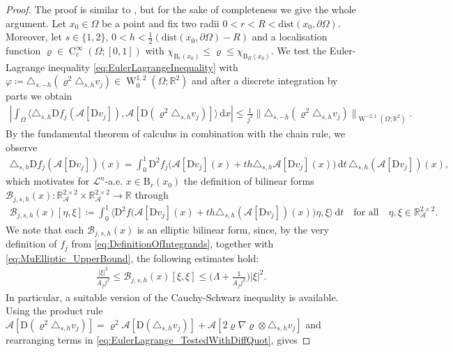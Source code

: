 \documentclass[a4paper,10pt,reqno,oneside]{amsart}
\numberwithin{equation}{section}
\newcommand{\R}{\mathbb R}
\newcommand{\ball}{\mathrm{B}}
\newcommand{\A}{\mathscr{A}}
\newcommand{\Leb}{\mathscr{L}}
\newcommand{\sobo}{\operatorname{W}}
\newcommand{\hold}{\operatorname{C}}
\newcommand{\D}{\mathrm{D}}
\newcommand{\dx}[1]{\,\mathrm{d}#1}
\newcommand{\del}{\partial}
\newcommand{\skalarProd}[2]{\big\langle#1,#2\big\rangle}
\newcommand{\abs}[1]{\left\lvert#1\right\rvert}
\begin{document}
\begin{proof}
	The proof is similar to \cite[Lemma 4.2]{Gmeineder}, but for the sake of completeness we give the whole argument. Let $x_0\in\Omega$ be a point and fix two radii $0<r<R<\mathrm{dist}(x_0,\del\Omega)$. Moreover, let $s\in\{1,2\}$,  $0<h<\frac{1}{2}(\mathrm{dist}(x_0,\del\Omega)-R)$ and a localisation function $\varrho\in\hold^\infty_c(\Omega;[0,1])$ with $\chi_{\ball_{r}(x_0)}\leq\varrho\leq \chi_{\ball_{R}(x_0)}$. We test the Euler-Lagrange inequality \eqref{eq:EulerLagrangeInequality} with $\varphi\coloneqq \triangle_{s,-h}(\varrho^2 \triangle_{s,h} v_j)\in\sobo^{1,2}_0(\Omega;\R^2)$ and after a discrete integration by parts we obtain
	\begin{align}\label{eq:EulerLagrange_TestedWithDiffQuot}
		\left\vert \int_\Omega \skalarProd{\triangle_{s,h}\D f_j(\A[\D v_j])}{\A[\D(\varrho^2 \triangle_{s,h}v_j)]}\dx{x} \right\vert \leq\frac{1}{j^2} \|\triangle_{s,-h}(\varrho^2 \triangle_{s,h}v_j)\|_{\sobo^{-2,1}(\Omega;\R^2)}. 
	\end{align}
	By the fundamental theorem of calculus in combination with the chain rule, we observe
	\begin{align*}
		\triangle_{s,h} \D f_j(\A[\D v_j])(x) 
		 = \int_0^1 \D^2 f_j\big(\A[\D v_j](x) + th \triangle_{s,h} \A[\D v_j](x)\big)\dx{t} \,\triangle_{s,h} (\A[\D v_j])(x),
	\end{align*}
	which motivates for $\Leb^n$-a.e. $x\in \ball_{r}(x_0)$ the definition of bilinear forms 
	$\mathscr{B}_{j,s,h}(x):\R^{2\times 2}_\A \times \R^{2\times 2}_\A\to \R$
	through
	 \begin{align*}
	 	\mathscr{B}_{j,s,h}(x)[\eta,\xi]\coloneqq \int_0^1 \skalarProd{\D^2 f\big(\A[\D v_j] (x) + th \triangle_{s,h}(\A[\D v_j])(x)\big)\eta }{\xi}\dx{t}\quad\mbox{for all}\quad \eta,\xi\in\R^{2\times 2}_\A. 
	 \end{align*}
 	We note that each $\mathscr{B}_{j,s,h}(x)$ is an elliptic bilinear form, since, by the very definition of $f_j$ from \eqref{eq:DefinitionOfIntegrands}, together with \eqref{eq:MuElliptic_UpperBound}, the following estimates hold:
 	\begin{align}\label{eq:BoundsBilinearform}
 		\frac{\abs{\xi}^2}{A_j j^2} \leq \mathscr{B}_{j,s,h}(x) [\xi,\xi] \leq \bigg(\Lambda + \frac{1}{A_j j^2}\bigg) \abs{\xi}^2. 
 	\end{align}
 	In particular, a suitable version of the Cauchy-Schwarz inequality is available. Using the product rule $\A[\D( \varrho^2 \triangle_{s,h}v_j)] = \varrho^2 \A[\D (\triangle_{s,h} v_j)] + \A[2\varrho\nabla\varrho\otimes \triangle_{s,h} v_j]$ and rearranging terms in \eqref{eq:EulerLagrange_TestedWithDiffQuot}, gives 

\end{proof}
\end{document}

